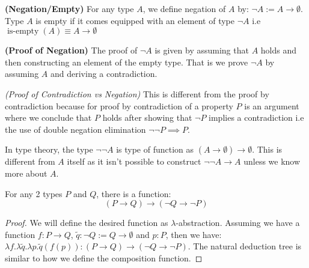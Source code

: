 \begin{definition}{\textbf{(Negation/Empty)}}
    For any type $A$, we define negation of $A$ by: $\neg A := A\rightarrow\emptyset$. Type $A$ is empty if it comes equipped with an element of type $\neg A$ i.e $\operatorname{is-empty}(A)\equiv A\to \emptyset$
\end{definition}

\begin{definition}{\textbf{(Proof of Negation)}}
    The proof of  $\neg A$ is given by assuming that $A$ holds and then constructing an element of the empty type. That is we prove $\neg A$ by assuming $A$ and deriving a contradiction. 
\end{definition}

\begin{remark}{\textit{(Proof of Contradiction vs Negation)}}
    This is different from the proof by contradiction because for proof by contradiction of a property $P$ is an argument where we conclude that $P$ holds after showing that $\neg P$ implies a contradiction i.e the use of double negation elimination $\neg\neg P\implies P$.

    In type theory, the type $\neg\neg A$ is type of function as $(A\rightarrow\emptyset)\rightarrow\emptyset$. This is different from $A$ itself as it isn't possible to construct $\neg\neg A\rightarrow A$ unless we know more about $A$.
\end{remark}

\begin{proposition}
    For any 2 types $P$ and $Q$, there is a function:
    \begin{equation*}
        (P\rightarrow Q)\rightarrow (\neg Q\rightarrow \neg P)
    \end{equation*}
\end{proposition}
\begin{proof}
    We will define the desired function as $\lambda$-abstraction. Assuming we have a function $f:P\to Q$, $\tilde{q}:\neg Q:=Q\to\emptyset$ and $p:P$, then we have: $\lambda f.\lambda\tilde{q}.\lambda p.\tilde{q}(f(p)) : (P\rightarrow Q)\rightarrow (\neg Q\rightarrow \neg P)$. The natural deduction tree is similar to how we define the composition function.
\end{proof}


